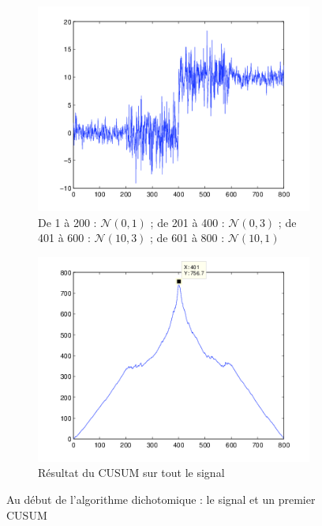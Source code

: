 \documentclass[french,11pt,notitlepage]{report}
\begin{document}
	\begin{figure}[hp]
		\begin{subfigure}[t]{.49\textwidth}
			\includegraphics[width=\linewidth,height=.24\textheight]{test_multi_mid.png}
			\caption{De 1 à 200 : $\mathcal{N}(0,1)$ ; de 201 à 400 : $\mathcal{N}(0,3)$ ; de 401 à 600 : $\mathcal{N}(10,3)$ ; de 601 à 800 : $\mathcal{N}(10,1)$}
			\label{test_multi_dikt}
		\end{subfigure}
		\hfill
		\begin{subfigure}[t]{.49\textwidth}
		  \includegraphics[width=\linewidth,height=.24\textheight]{mle1.png}
			\caption{Résultat du CUSUM sur tout le signal}
			\label{mle1}
		\end{subfigure}	
	\caption{Au début de l'algorithme dichotomique : le signal et un premier CUSUM}
	\label{testdikt1}
	\end{figure}
	
\end{document}
